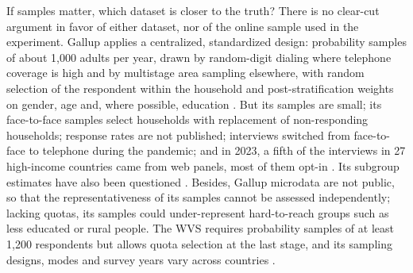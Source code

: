 \documentclass[12pt]{article}
\begin{document}
If samples matter, which dataset is closer to the truth? There is no clear-cut argument in favor of either dataset, nor of the online sample used in the experiment. Gallup applies a centralized, standardized design: probability samples of about 1,000 adults per year, drawn by random-digit dialing where telephone coverage is high and by multistage area sampling elsewhere, with random selection of the respondent within the household and post-stratification weights on gender, age and, where possible, education \citep{gallup_methodology_2023}. But its samples are small; its face-to-face samples select households %
with replacement of non-responding households; response rates are not published; interviews switched from face-to-face to telephone during the pandemic; and in 2023, a fifth of the interviews in 27 high-income countries came from web panels, most of them opt-in \citep{gallup_methodology_2023}. Its subgroup estimates have also been questioned \citep{blanchflower_gallup_2024}. Besides, Gallup microdata are not public, so that the representativeness of its samples cannot be assessed independently; lacking quotas, its samples could under-represent hard-to-reach groups such as less educated or rural people. The WVS requires probability samples of at least 1,200 respondents but allows quota selection at the last stage, and its sampling designs, modes and survey years vary across countries \citep{wvs_rules_wave8}. %
\end{document}
